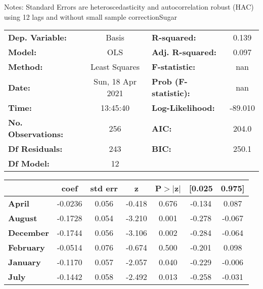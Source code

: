 Notes: \newline
 [1] Standard Errors are heteroscedasticity and autocorrelation robust (HAC) using 12 lags and without small sample correctionSugar\begin{center}
\begin{tabular}{lclc}
\toprule
\textbf{Dep. Variable:}    &      Basis       & \textbf{  R-squared:         } &     0.139   \\
\textbf{Model:}            &       OLS        & \textbf{  Adj. R-squared:    } &     0.097   \\
\textbf{Method:}           &  Least Squares   & \textbf{  F-statistic:       } &       nan   \\
\textbf{Date:}             & Sun, 18 Apr 2021 & \textbf{  Prob (F-statistic):} &      nan    \\
\textbf{Time:}             &     13:45:40     & \textbf{  Log-Likelihood:    } &   -89.010   \\
\textbf{No. Observations:} &         256      & \textbf{  AIC:               } &     204.0   \\
\textbf{Df Residuals:}     &         243      & \textbf{  BIC:               } &     250.1   \\
\textbf{Df Model:}         &          12      & \textbf{                     } &             \\
\bottomrule
\end{tabular}
\begin{tabular}{lcccccc}
                   & \textbf{coef} & \textbf{std err} & \textbf{z} & \textbf{P$> |$z$|$} & \textbf{[0.025} & \textbf{0.975]}  \\
\midrule
\textbf{April}     &      -0.0236  &        0.056     &    -0.418  &         0.676        &       -0.134    &        0.087     \\
\textbf{August}    &      -0.1728  &        0.054     &    -3.210  &         0.001        &       -0.278    &       -0.067     \\
\textbf{December}  &      -0.1744  &        0.056     &    -3.106  &         0.002        &       -0.284    &       -0.064     \\
\textbf{February}  &      -0.0514  &        0.076     &    -0.674  &         0.500        &       -0.201    &        0.098     \\
\textbf{January}   &      -0.1170  &        0.057     &    -2.057  &         0.040        &       -0.229    &       -0.006     \\
\textbf{July}      &      -0.1442  &        0.058     &    -2.492  &         0.013        &       -0.258    &       -0.031     \\

\end{tabular}
\end{center}
